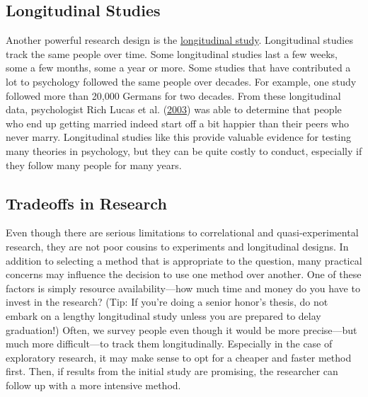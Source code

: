 \documentclass[
]{krantz}
\begin{document}
\hypertarget{longitudinal-studies}{%
\subsection*{Longitudinal Studies}\label{longitudinal-studies}}


Another powerful research design is the \protect\hyperlink{longitudinal-study}{longitudinal study}. Longitudinal studies track the same people over time. Some longitudinal studies last a few weeks, some a few months, some a year or more. Some studies that have contributed a lot to psychology followed the same people over decades. For example, one study followed more than 20,000 Germans for two decades. From these longitudinal data, psychologist Rich Lucas et al. (\protect\hyperlink{ref-lucas2003}{2003}) was able to determine that people who end up getting married indeed start off a bit happier than their peers who never marry. Longitudinal studies like this provide valuable evidence for testing many theories in psychology, but they can be quite costly to conduct, especially if they follow many people for many years.

\hypertarget{tradeoffs-in-research}{%
\subsection*{Tradeoffs in Research}\label{tradeoffs-in-research}}


Even though there are serious limitations to correlational and quasi-experimental research, they are not poor cousins to experiments and longitudinal designs. In addition to selecting a method that is appropriate to the question, many practical concerns may influence the decision to use one method over another. One of these factors is simply resource availability---how much time and money do you have to invest in the research? (Tip: If you're doing a senior honor's thesis, do not embark on a lengthy longitudinal study unless you are prepared to delay graduation!) Often, we survey people even though it would be more precise---but much more difficult---to track them longitudinally. Especially in the case of exploratory research, it may make sense to opt for a cheaper and faster method first. Then, if results from the initial study are promising, the researcher can follow up with a more intensive method.
\end{document}
